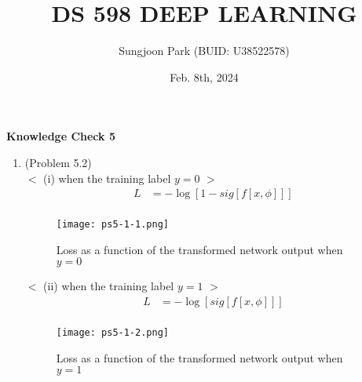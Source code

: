\documentclass[10pt]{article}
\title{DS 598 DEEP LEARNING}
\author{Sungjoon Park (BUID: U38522578)}
\date{Feb. 8th, 2024}
\begin{document}
\maketitle

\setlength{\parindent}{0cm}
\setlength{\parskip}{2mm}

\textbf{Knowledge Check 5}

\begin{enumerate}

\item (Problem 5.2) \\
	$<$ (i) when the training label $y=0$ $>$
	\begin{align*}
	L &= -\log[1-sig[f[x, \phi]]] \\
	\end{align*}
	
	\begin{center}
		\begin{figure}[h]	
		\texttt{[image: ps5-1-1.png]}
		\vspace*{-2mm}
		\caption{Loss as a function of the transformed network output when $y=0$}
		\end{figure}
	\end{center}
	
	$<$ (ii) when the training label $y=1$ $>$ \\
	\begin{align*}
	L &= -\log[sig[f[x, \phi]]] \\
	\end{align*}
	
	\begin{center}
		\begin{figure}[h]	
		\texttt{[image: ps5-1-2.png]}
		\vspace*{-2mm}
		\caption{Loss as a function of the transformed network output when $y=1$}
		\end{figure}
	\end{center}

\


\end{enumerate}
\end{document}
